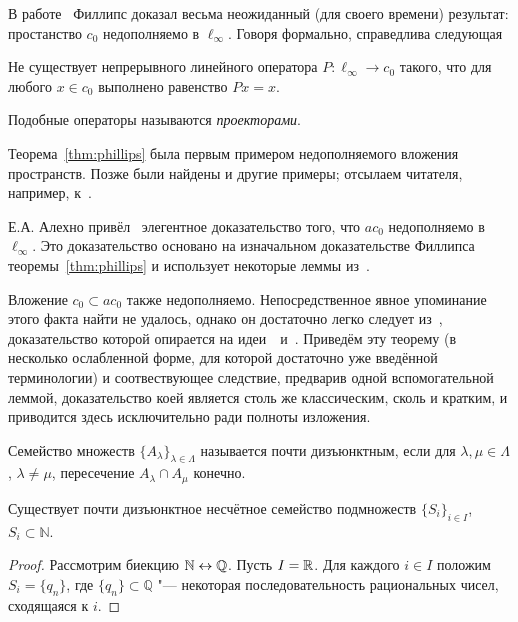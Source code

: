 В работе~\cite{phillips1940linear} Филлипс доказал весьма неожиданный (для своего времени) результат:
простанство $c_0$ недополняемо в $\ell_\infty$.
Говоря формально, справедлива следующая


\begin{theorem}[Филлипса]
	\label{thm:phillips}
	Не существует непрерывного линейного оператора $P: \ell_\infty \to c_0$ такого, что для любого
	$x \in c_0$ выполнено равенство $Px =x$.
\end{theorem}
Подобные операторы называются \emph{проекторами}.

Теорема~\ref{thm:phillips} была первым примером недополняемого вложения пространств.
Позже были найдены и другие примеры;
отсылаем читателя, например, к~\cite{lindenstrauss1979classical}.

Е.А. Алехно привёл~\cite[Theorem 8]{alekhno2006propertiesII} элегентное доказательство
того, что $ac_0$ недополняемо в $\ell_\infty$.
Это доказательство основано на изначальном доказательстве Филлипса теоремы~\ref{thm:phillips}
и использует некоторые леммы из~\cite{phillips1940linear}.

Вложение $c_0 \subset ac_0$ также недополняемо.
Непосредственное явное упоминание этого факта найти не удалось, однако он достаточно легко следует из~\cite[теорема 4]{ASSU2},
доказательство которой опирается на идеи~\cite{whitley1968projecting}~и~\cite[Theorem 6.9]{Carothers}.
Приведём эту теорему (в несколько ослабленной форме, для которой достаточно уже введённой терминологии)
и соотвествующее следствие, предварив одной вспомогательной леммой, доказательство коей является столь же классическим, сколь и кратким,
и приводится здесь исключительно ради полноты изложения.

\begin{definition}
	Семейство множеств $\{A_\lambda\}_{\lambda \in \Lambda}$ называется почти дизъюнктным,
	если для $\lambda, \mu \in \Lambda$, $\lambda \ne \mu$,
	пересечение $A_\lambda \cap A_\mu$ конечно.
\end{definition}

\begin{lemma}
	\label{lem:uncountable_subsets_of_N_with_finite_intersections}
	Существует почти дизъюнктное несчётное семейство подмножеств $\{S_i\}_{i\in I}$, $S_i \subset \mathbb{N}$.
\end{lemma}

\begin{proof}
	Рассмотрим биекцию $\mathbb{N} \leftrightarrow \mathbb{Q}$.
	Пусть $I = \mathbb{R}$.
	Для каждого $i\in I$ положим $S_i = \{q_n\}$,
	где $\{q_n\} \subset \mathbb{Q}$ "--- некоторая последовательность рациональных чисел,
	сходящаяся к $i$.
\end{proof}

